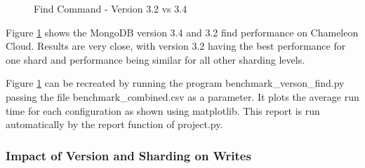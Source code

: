 \documentclass[sigconf]{acmart}
\begin{document}
\begin{figure}[htbp]
\centering
{}
\caption{Find Command - Version 3.2 vs 3.4}
\label{fig:version-find}
\end{figure}

Figure \ref{fig:version-find} shows the MongoDB version 3.4 and 3.2 find performance on Chameleon Cloud.  Results are very close, with version 3.2 having the best performance for one shard and performance being similar for all other sharding levels.

Figure \ref{fig:version-find} can be recreated by running the program benchmark\_verson\_find.py passing the file benchmark\_combined.csv as a parameter.  It plots the average run time for each configuration as shown using matplotlib.  This report is run automatically by the report function of project.py.

\subsubsection{Impact of Version and Sharding on Writes}
\end{document}

